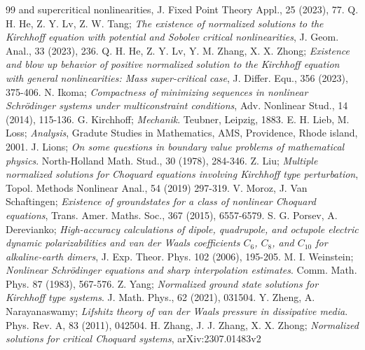 \documentclass[10pt,a4paper]{amsart}
\numberwithin{equation}{section}
\begin{document}
\begin{thebibliography}{99}
{ and supercritical nonlinearities}, J. Fixed Point Theory Appl., 25 (2023), 77.
 Q. H. He, Z. Y. Lv, Z. W. Tang;
\emph{The existence of normalized solutions to the Kirchhoff equation with potential 
and Sobolev critical nonlinearities}, J. Geom. Anal., 33 (2023), 236.
 Q. H. He, Z. Y. Lv, Y. M. Zhang, X. X. Zhong;
\emph{Existence and blow up behavior of positive normalized solution to the Kirchhoff
 equation with general nonlinearities:  Mass super-critical case},
  J. Differ. Equ., 356 (2023), 375-406.
 N. Ikoma;
\emph{Compactness of minimizing sequences in nonlinear Schr\"{o}dinger systems under
multiconstraint conditions}, Adv. Nonlinear Stud., 14 (2014), 115-136.
 G. Kirchhoff;
\emph{Mechanik}. Teubner, Leipzig, 1883.
 E. H. Lieb, M. Loss;
\emph{Analysis}, Gradute Studies in Mathematics, AMS, Providence, Rhode island,
2001.
 J. Lions;
\emph{On some questions in boundary value problems of mathematical physics}. 
North-Holland Math. Stud., 30 (1978), 284-346.
 Z. Liu;
\emph{Multiple normalized solutions for Choquard equations involving Kirchhoff type 
perturbation}, Topol. Methods Nonlinear Anal., 54 (2019) 297-319.
 V. Moroz, J. Van Schaftingen;
\emph{Existence of groundstates for a class of nonlinear Choquard
equations}, Trans. Amer. Maths. Soc., 367 (2015), 6557-6579.
 S. G. Porsev, A. Derevianko;
\emph{High-accuracy calculations of dipole, quadrupole, and octupole electric dynamic 
polarizabilities and van der Waals coefficients $C_6$, $C_8$, and $C_{10}$ 
for alkaline-earth dimers}, J. Exp. Theor. Phys. 102 (2006), 195-205.
 M. I. Weinstein;
\emph{Nonlinear Schr\"{o}dinger equations and sharp interpolation estimates}.
Comm. Math. Phys. 87 (1983), 567-576.
 Z. Yang;
\emph{Normalized ground state solutions for Kirchhoff type systems}. 
J. Math. Phys., 62 (2021), 031504.
 Y. Zheng, A. Narayanaswamy;
\emph{Lifshitz theory of van der Waals pressure in dissipative media}. 
Phys. Rev. A, 83 (2011), 042504.
 H. Zhang, J. J. Zhang, X. X. Zhong;
\emph{Normalized solutions for critical Choquard systems}, arXiv:2307.01483v2
\end{thebibliography}
\end{document}
